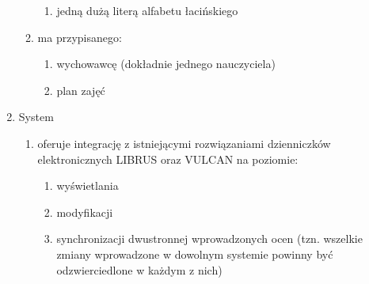 \documentclass{article}
\begin{document}
\begin{enumerate}
\begin{enumerate}
\begin{enumerate}
      \item jedną dużą literą alfabetu łacińskiego
    \end{enumerate}
    \item ma przypisanego:
    \begin{enumerate}
      \item wychowawcę (dokładnie jednego nauczyciela)
      \item plan zajęć
    \end{enumerate}
\end{enumerate}
\item System
  \begin{enumerate}
    \item oferuje integrację z istniejącymi rozwiązaniami dzienniczków elektronicznych LIBRUS oraz VULCAN na poziomie:
    \begin{enumerate}
      \item wyświetlania
      \item modyfikacji
      \item synchronizacji dwustronnej wprowadzonych ocen (tzn. wszelkie zmiany wprowadzone w dowolnym systemie powinny być odzwierciedlone w każdym z nich)
    \end{enumerate}
\end{enumerate}
\end{enumerate}
\end{document}
